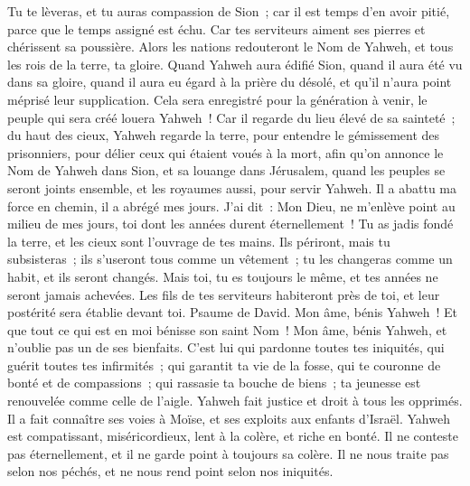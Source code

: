 \begin{multicols}{2}
Tu te lèveras, et tu auras compassion de Sion~; car il est temps d'en avoir pitié, parce que le temps assigné est échu.
Car tes serviteurs aiment ses pierres et chérissent sa poussière.
Alors les nations redouteront le Nom de Yahweh, et tous les rois de la terre, ta gloire.
Quand Yahweh aura édifié Sion, quand il aura été vu dans sa gloire,
quand il aura eu égard à la prière du désolé, et qu'il n'aura point méprisé leur supplication.
Cela sera enregistré pour la génération à venir, le peuple qui sera créé louera Yahweh~!
Car il regarde du lieu élevé de sa sainteté~; du haut des cieux, Yahweh regarde la terre,
pour entendre le gémissement des prisonniers, pour délier ceux qui étaient voués à la mort,
afin qu'on annonce le Nom de Yahweh dans Sion, et sa louange dans Jérusalem,
quand les peuples se seront joints ensemble, et les royaumes aussi, pour servir Yahweh.
Il a abattu ma force en chemin, il a abrégé mes jours.
J'ai dit~: Mon Dieu, ne m'enlève point au milieu de mes jours, toi dont les années durent éternellement~!
Tu as jadis fondé la terre, et les cieux sont l'ouvrage de tes mains.
Ils périront, mais tu subsisteras~; ils s'useront tous comme un vêtement~; tu les changeras comme un habit, et ils seront changés.
Mais toi, tu es toujours le même, et tes années ne seront jamais achevées.
Les fils de tes serviteurs habiteront près de toi, et leur postérité sera établie devant toi.
\VerseOne{}Psaume de David. Mon âme, bénis Yahweh~! Et que tout ce qui est en moi bénisse son saint Nom~!
Mon âme, bénis Yahweh, et n'oublie pas un de ses bienfaits.
C'est lui qui pardonne toutes tes iniquités, qui guérit toutes tes infirmités~;
qui garantit ta vie de la fosse, qui te couronne de bonté et de compassions~;
qui rassasie ta bouche de biens~; ta jeunesse est renouvelée comme celle de l'aigle.
Yahweh fait justice et droit à tous les opprimés.
Il a fait connaître ses voies à Moïse, et ses exploits aux enfants d'Israël.
Yahweh est compatissant, miséricordieux, lent à la colère, et riche en bonté.
Il ne conteste pas éternellement, et il ne garde point à toujours sa colère.
Il ne nous traite pas selon nos péchés, et ne nous rend point selon nos iniquités.

\end{multicols}
